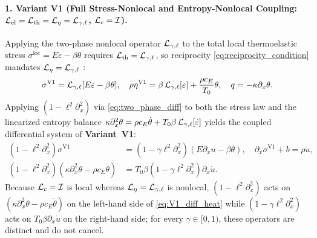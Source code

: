 \paragraph{1. Variant V1 (Full Stress-Nonlocal and Entropy-Nonlocal Coupling: $\mathcal{L}_{\mathrm{el}} = \mathcal{L}_{\mathrm{th}} = \mathcal{L}_\eta = \mathcal{L}_{\gamma,\ell}$, $\mathcal{L}_c = \mathcal{I}$).}
Applying the two-phase nonlocal operator $\mathcal{L}_{\gamma,\ell}$ to the total local thermoelastic stress $\sigma^{\mathrm{loc}} = E\varepsilon - \beta\theta$ requires $\mathcal{L}_{\mathrm{th}} = \mathcal{L}_{\gamma,\ell}$, so reciprocity \eqref{eq:reciprocity_condition} mandates $\mathcal{L}_\eta = \mathcal{L}_{\gamma,\ell}$ \cite{Eringen1974}:
\begin{equation}\label{eq:V1_integral}
  \sigma^{\mathrm{V1}} = \mathcal{L}_{\gamma,\ell}[E\varepsilon - \beta\theta], \quad
  \rho\eta^{\mathrm{V1}} = \beta\,\mathcal{L}_{\gamma,\ell}[\varepsilon] + \frac{\rho c_E}{T_0}\theta, \quad
  q = -\kappa\partial_x\theta.
\end{equation}
Applying $(1-\ell^2\partial_x^2)$ via \eqref{eq:two_phase_diff} to both the stress law and the linearized entropy balance $\kappa\partial_x^2\theta = \rho c_E\dot{\theta} + T_0\beta\,\mathcal{L}_{\gamma,\ell}[\dot{\varepsilon}]$ yields the coupled differential system of \textbf{Variant~V1}:
\begin{align}
  (1 - \ell^2\partial_x^2)\sigma^{\mathrm{V1}} &= (1 - \gamma\ell^2\partial_x^2)(E\partial_x u - \beta\theta), \quad
  \partial_x\sigma^{\mathrm{V1}} + b = \rho\ddot{u}, \label{eq:V1_diff_stress}\\
  (1 - \ell^2\partial_x^2)(\kappa\partial_x^2\theta - \rho c_E\dot{\theta}) &= T_0\beta(1 - \gamma\ell^2\partial_x^2)\partial_x\dot{u}. \label{eq:V1_diff_heat}
\end{align}
Because $\mathcal{L}_c = \mathcal{I}$ is local whereas $\mathcal{L}_\eta = \mathcal{L}_{\gamma,\ell}$ is nonlocal, $(1-\ell^2\partial_x^2)$ acts on $(\kappa\partial_x^2\theta - \rho c_E\dot{\theta})$ on the left-hand side of \eqref{eq:V1_diff_heat} while $(1-\gamma\ell^2\partial_x^2)$ acts on $T_0\beta\partial_x\dot{u}$ on the right-hand side; for every $\gamma \in [0,1)$, these operators are distinct and do not cancel.

